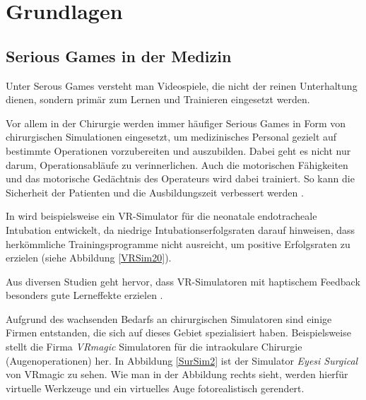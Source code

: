 \chapter{Grundlagen}

\section{Serious Games in der Medizin}
\label{sec_SeriousGames}



Unter Serous Games versteht man Videospiele, die nicht der reinen Unterhaltung dienen, sondern primär zum Lernen und Trainieren eingesetzt werden.

Vor allem in der Chirurgie werden immer häufiger Serious Games in Form von chirurgischen Simulationen eingesetzt, um medizinisches Personal gezielt auf bestimmte Operationen vorzubereiten und auszubilden. Dabei geht es nicht nur darum, Operationsabläufe zu verinnerlichen. Auch die motorischen Fähigkeiten und das motorische Gedächtnis des Operateurs wird dabei trainiert. So kann die Sicherheit der Patienten und die Ausbildungszeit verbessert werden \cite{SimRole}.

In \cite{VRSim20} wird beispielsweise ein VR-Simulator für die neonatale endotracheale Intubation entwickelt, da niedrige Intubationserfolgsraten darauf hinweisen, dass herkömmliche Trainingsprogramme nicht ausreicht, um positive Erfolgsraten zu erzielen (siehe Abbildung \ref{VRSim20}).


Aus diversen Studien geht hervor, dass VR-Simulatoren mit haptischem Feedback besonders gute Lerneffekte erzielen \cite{VRHapticSim}.

Aufgrund des wachsenden Bedarfs an chirurgischen Simulatoren sind einige Firmen entstanden, die sich auf dieses Gebiet spezialisiert haben. Beispielsweise stellt die Firma \textit{VRmagic} \cite{VRmagic} Simulatoren für die intraokulare Chirurgie (Augenoperationen) her. In Abbildung \ref{SurSim2} ist der Simulator \textit{Eyesi Surgical} von VRmagic zu sehen. Wie man in der Abbildung rechts sieht, werden hierfür virtuelle Werkzeuge und ein virtuelles Auge fotorealistisch gerendert.

